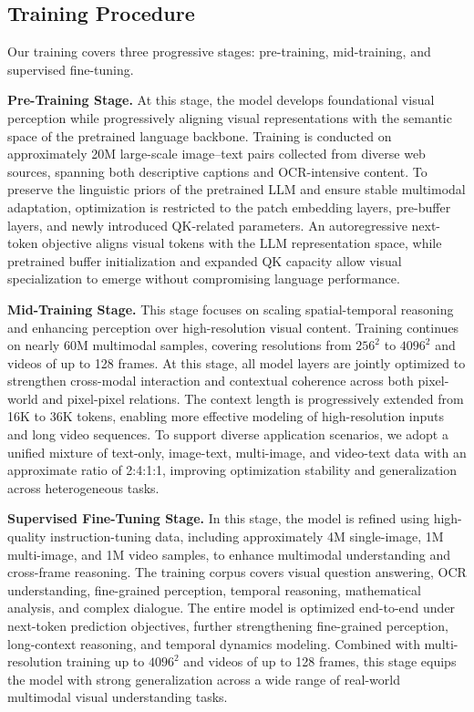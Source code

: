 \documentclass[11pt]{article}
\begin{document}
\subsection{Training Procedure}
Our training covers three progressive stages: pre-training, mid-training, and supervised fine-tuning.

\textbf{Pre-Training Stage.}
At this stage, the model develops foundational visual perception while progressively aligning visual representations with the semantic space of the pretrained language backbone. Training is conducted on approximately 20M large-scale image–text pairs collected from diverse web sources, spanning both descriptive captions and OCR-intensive content.
%
To preserve the linguistic priors of the pretrained LLM and ensure stable multimodal adaptation, optimization is restricted to the patch embedding layers, pre-buffer layers, and newly introduced QK-related parameters. An autoregressive next-token objective aligns visual tokens with the LLM representation space, while pretrained buffer initialization and expanded QK capacity allow visual specialization to emerge without compromising language performance.


\textbf{Mid-Training Stage.}
This stage focuses on scaling spatial-temporal reasoning and enhancing perception over high-resolution visual content. Training continues on nearly 60M multimodal samples, covering resolutions from $256^2$ to $4096^2$ and videos of up to 128 frames.
%
At this stage, all model layers are jointly optimized to strengthen cross-modal interaction and contextual coherence across both pixel-world and pixel-pixel relations. The context length is progressively extended from 16K to 36K tokens, enabling more effective modeling of high-resolution inputs and long video sequences. To support diverse application scenarios, we adopt a unified mixture of text-only, image-text, multi-image, and video-text data with an approximate ratio of 2:4:1:1, improving optimization stability and generalization across heterogeneous tasks.


\textbf{Supervised Fine-Tuning Stage.}
In this stage, the model is refined using high-quality instruction-tuning data, including approximately 4M single-image, 1M multi-image, and 1M video samples, to enhance multimodal understanding and cross-frame reasoning. The training corpus covers visual question answering, OCR understanding, fine-grained perception, temporal reasoning, mathematical analysis, and complex dialogue.
%
The entire model is optimized end-to-end under next-token prediction objectives, further strengthening fine-grained perception, long-context reasoning, and temporal dynamics modeling. Combined with multi-resolution training up to $4096^2$ and videos of up to 128 frames, this stage equips the model with strong generalization across a wide range of real-world multimodal visual understanding tasks.
\end{document}
